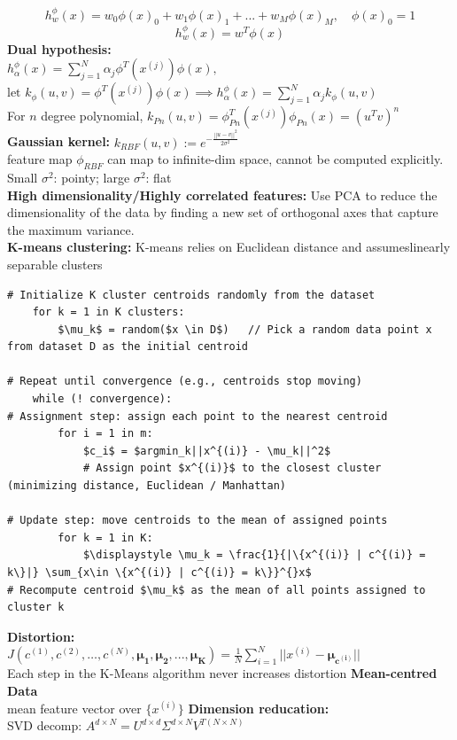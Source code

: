 \documentclass[8pt,twocolumn]{article}
\begin{document}
\[h^{\phi}_w(x) = w_0\phi(x)_0 + w_1\phi(x)_1 + ... + w_M\phi(x)_M,\quad \phi(x)_0 = 1\]
\[h^{\phi}_w(x) = w^T\phi(x)\]
\textbf{Dual hypothesis:}\\
$h^{\phi}_\alpha(x) = \sum_{j=1}^{N}\alpha_j \phi^T(x^{(j)})\phi(x),$
$\text{let } k_\phi(u, v) = \phi^T(x^{(j)})\phi(x) \implies h^{\phi}_\alpha(x) = \sum_{j=1}^{N}\alpha_j k_\phi(u, v)$\\
For $n$ degree polynomial, $k_{Pn}(u, v) = \phi_{Pn}^T(x^{(j)})\phi_{Pn}(x) = (u^Tv)^n$\\
\textbf{Gaussian kernel:} $k_{RBF}(u, v):= e^{-\frac{||u-v||^2}{2\sigma^2}}$\\
feature map $\phi_{RBF}$ can map to infinite-dim space, cannot be computed explicitly. \\
Small $\sigma^2$: pointy; large $\sigma^2$: flat\\
\textbf{High dimensionality/Highly correlated features:} Use PCA to reduce the dimensionality of the data by finding a new set of orthogonal axes that capture the maximum variance. \\
\textbf{K-means clustering:} K-means relies on Euclidean distance and assumeslinearly separable clusters
\begin{lstlisting}[mathescape = true]
# Initialize K cluster centroids randomly from the dataset
    for k = 1 in K clusters:
        $\mu_k$ = random($x \in D$)   // Pick a random data point x from dataset D as the initial centroid
    
# Repeat until convergence (e.g., centroids stop moving)
    while (! convergence):
# Assignment step: assign each point to the nearest centroid
        for i = 1 in m:
            $c_i$ = $argmin_k||x^{(i)} - \mu_k||^2$   
            # Assign point $x^{(i)}$ to the closest cluster (minimizing distance, Euclidean / Manhattan)
    
# Update step: move centroids to the mean of assigned points
        for k = 1 in K:
            $\displaystyle \mu_k = \frac{1}{|\{x^{(i)} | c^{(i)} = k\}|} \sum_{x\in \{x^{(i)} | c^{(i)} = k\}}^{}x$  
# Recompute centroid $\mu_k$ as the mean of all points assigned to cluster k
    \end{lstlisting}
\textbf{Distortion:}\\
$J(c^{(1)}, c^{(2)}, \dots, c^{(N)}, \boldsymbol{\mu_1}, \boldsymbol{\mu_2}, ..., \boldsymbol{\mu_K}) = \frac{1}{N}\sum_{i=1}^{N}||x^{(i)} - \boldsymbol{\mu_{c^{(i)}}}||$\\
Each step in the K-Means algorithm never increases distortion
\textbf{Mean-centred Data}\\
mean feature vector over $\{x^{(i)}\}$
\textbf{Dimension reducation:}\\
SVD decomp: $A^{d \times N} = U^{d \times d}\Sigma^{d \times N} V^{T {(N \times N)}}$
\end{document}
